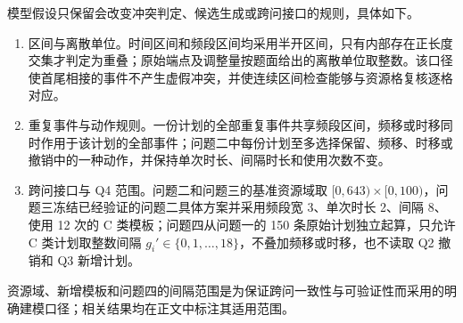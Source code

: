 模型假设只保留会改变冲突判定、候选生成或跨问接口的规则，具体如下。

\begin{enumerate}[label=(\arabic*), leftmargin=*, itemsep=0.35em, topsep=0.25em, parsep=0pt]
  \item 区间与离散单位。时间区间和频段区间均采用半开区间，只有内部存在正长度交集才判定为重叠；原始端点及调整量按题面给出的离散单位取整数。该口径使首尾相接的事件不产生虚假冲突，并使连续区间检查能够与资源格复核逐格对应。\label{ass:interval}
  \item 重复事件与动作规则。一份计划的全部重复事件共享频段区间，频移或时移同时作用于该计划的全部事件；问题二中每份计划至多选择保留、频移、时移或撤销中的一种动作，并保持单次时长、间隔时长和使用次数不变。\label{ass:action}
  \item 跨问接口与 Q4 范围。问题二和问题三的基准资源域取 \([0,643)\times[0,100)\)，问题三冻结已经验证的问题二具体方案并采用频段宽 3、单次时长 2、间隔 8、使用 12 次的 C 类模板；问题四从问题一的 150 条原始计划独立起算，只允许 C 类计划取整数间隔 \(g_i'\in\{0,1,\ldots,18\}\)，不叠加频移或时移，也不读取 Q2 撤销和 Q3 新增计划。\label{ass:cross-interface}
\end{enumerate}

资源域、新增模板和问题四的间隔范围是为保证跨问一致性与可验证性而采用的明确建模口径；相关结果均在正文中标注其适用范围。
